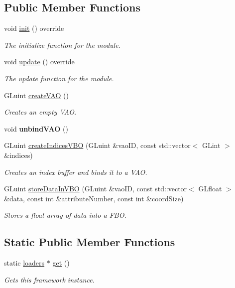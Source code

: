 \subsection*{Public Member Functions}
\begin{DoxyCompactItemize}
\item 
void \hyperlink{classflounder_1_1loaders_af99df6ebe1886b87efbca82842be0d0d}{init} () override
\begin{DoxyCompactList}\small\item\em The initialize function for the module. \end{DoxyCompactList}\item 
void \hyperlink{classflounder_1_1loaders_a9becf522a74f35f7e3dc7839577ba736}{update} () override
\begin{DoxyCompactList}\small\item\em The update function for the module. \end{DoxyCompactList}\item 
G\+Luint \hyperlink{classflounder_1_1loaders_a90123e47d1422f5e202a7ac439fee050}{create\+V\+AO} ()
\begin{DoxyCompactList}\small\item\em Creates an empty V\+AO. \end{DoxyCompactList}\item 
\mbox{\label{classflounder_1_1loaders_ad408dde74d3bcf097ce9dd97c29e7f12}} 
void {\bfseries unbind\+V\+AO} ()
\item 
G\+Luint \hyperlink{classflounder_1_1loaders_afcc6aaec9391699f25a014a7cd203592}{create\+Indices\+V\+BO} (G\+Luint \&vao\+ID, const std\+::vector$<$ G\+Lint $>$ \&indices)
\begin{DoxyCompactList}\small\item\em Creates an index buffer and binds it to a V\+AO. \end{DoxyCompactList}\item 
G\+Luint \hyperlink{classflounder_1_1loaders_a035a42c2f558c1f126cc54729388fca3}{store\+Data\+In\+V\+BO} (G\+Luint \&vao\+ID, const std\+::vector$<$ G\+Lfloat $>$ \&data, const int \&attribute\+Number, const int \&coord\+Size)
\begin{DoxyCompactList}\small\item\em Stores a float array of data into a F\+BO. \end{DoxyCompactList}\end{DoxyCompactItemize}
\subsection*{Static Public Member Functions}
\begin{DoxyCompactItemize}
\item 
static \hyperlink{classflounder_1_1loaders}{loaders} $\ast$ \hyperlink{classflounder_1_1loaders_ac57855261d2d43c545cac42e9efe981a}{get} ()
\begin{DoxyCompactList}\small\item\em Gets this framework instance. \end{DoxyCompactList}\end{DoxyCompactItemize}
